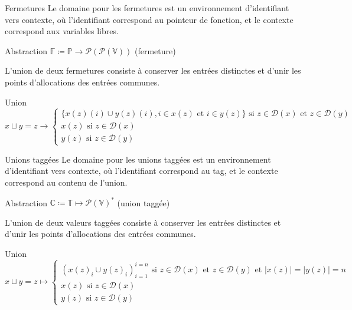 \documentclass{beamer}
\begin{document}
\begin{frame}{Fermetures}
    Le domaine pour les fermetures est un environnement d'identifiant vers contexte, où l'identifiant correspond au pointeur de fonction, et le contexte correspond aux variables libres.
    \begin{block}{Abstraction}
        $\mathbb{F} \coloneqq \mathbb{P} \rightarrow \mathcal{P}(\mathcal{P}(\mathbb{V}))$ (fermeture)
    \end{block}

    L'union de deux fermetures consiste à conserver les entrées distinctes et d'unir les points d'allocations des entrées communes.%
    
    \begin{block}{Union}
        $$
        x \sqcup y = z \rightarrow
        \begin{cases}
            \lbrace x(z)(i) \cup y(z)(i), i \in x(z) \text{ et } i \in y(z) \rbrace \text{ si } z \in \mathcal{D}(x) \text{ et } z \in \mathcal{D}(y) \\
            x(z) \text{ si } z \in \mathcal{D}(x) \\
            y(z) \text{ si } z \in \mathcal{D}(y)
        \end{cases}
        $$
    \end{block}
\end{frame}

\begin{frame}{Unions taggées}
    Le domaine pour les unions taggées est un environnement d'identifiant vers contexte, où l'identifiant correspond au tag, et le contexte correspond au contenu de l'union.

    \begin{block}{Abstraction}
        $\mathbb{C} \coloneqq \mathbb{T} \mapsto \mathcal{P}(\mathbb{V})^{*}$ (union taggée)
    \end{block}

    L'union de deux valeurs taggées consiste à conserver les entrées distinctes et d'unir les points d'allocations des entrées communes.%
    
    \begin{block}{Union}
        $$
        x \sqcup y = z \mapsto
        \begin{cases}
            \left( x(z)_i \cup y(z)_i \right)_{i=1}^{i=n} \text{ si } z \in \mathcal{D}(x) \text{ et } z \in \mathcal{D}(y) \text{ et } |x(z)| = |y(z)| = n \\
            x(z) \text{ si } z \in \mathcal{D}(x) \\
            y(z) \text{ si } z \in \mathcal{D}(y)
        \end{cases}
        $$
    \end{block}
\end{frame}
\end{document}
